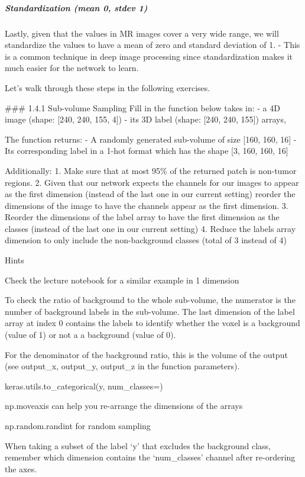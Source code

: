 \documentclass[11pt]{article}
\begin{document}
\hypertarget{standardization-mean-0-stdev-1}{%
\subparagraph{Standardization (mean 0, stdev
1)}\label{standardization-mean-0-stdev-1}}

Lastly, given that the values in MR images cover a very wide range, we
will standardize the values to have a mean of zero and standard
deviation of 1. - This is a common technique in deep image processing
since standardization makes it much easier for the network to learn.

Let's walk through these steps in the following exercises.

     \#\#\# 1.4.1 Sub-volume Sampling Fill in the function below takes in: -
a 4D image (shape: {[}240, 240, 155, 4{]}) - its 3D label (shape:
{[}240, 240, 155{]}) arrays,

The function returns: - A randomly generated sub-volume of size {[}160,
160, 16{]} - Its corresponding label in a 1-hot format which has the
shape {[}3, 160, 160, 16{]}

Additionally: 1. Make sure that at most 95\% of the returned patch is
non-tumor regions. 2. Given that our network expects the channels for
our images to appear as the first dimension (instead of the last one in
our current setting) reorder the dimensions of the image to have the
channels appear as the first dimension. 3. Reorder the dimensions of the
label array to have the first dimension as the classes (instead of the
last one in our current setting) 4. Reduce the labels array dimension to
only include the non-background classes (total of 3 instead of 4)

     Hints

Check the lecture notebook for a similar example in 1 dimension

To check the ratio of background to the whole sub-volume, the numerator
is the number of background labels in the sub-volume. The last dimension
of the label array at index 0 contains the labels to identify whether
the voxel is a background (value of 1) or not a a background (value of
0).

For the denominator of the background ratio, this is the volume of the
output (see output\_x, output\_y, output\_z in the function parameters).

keras.utils.to\_categorical(y, num\_classes=)

 np.moveaxis can help you re-arrange the dimensions of the arrays

np.random.randint for random sampling

When taking a subset of the label `y' that excludes the background
class, remember which dimension contains the `num\_classes' channel
after re-ordering the axes.
\end{document}
